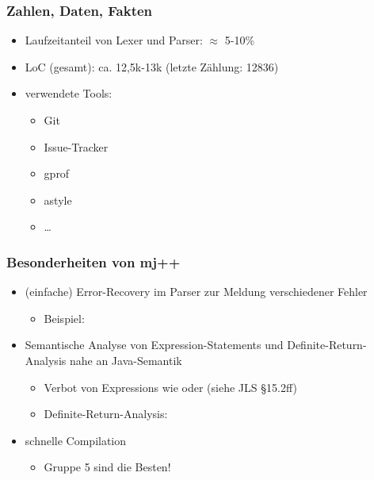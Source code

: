 \begin{frame}
	\frametitle{Zahlen, Daten, Fakten} %
	\begin{itemize}
		\item Laufzeitanteil von Lexer und Parser: $\approx$ 5-10\%	%
		\item LoC (gesamt): ca. 12,5k-13k (letzte Zählung: 12836)
		\item verwendete Tools: 
		\begin{itemize}
			\item Git
			\item Issue-Tracker
			\item gprof
			\item astyle
			\item \dots
		\end{itemize}
	\end{itemize}
\end{frame}

\begin{frame}
    \frametitle{Besonderheiten von mj++}
    \begin{itemize}
        \item (einfache) Error-Recovery im Parser zur Meldung verschiedener Fehler
        \begin{itemize}
        	\item Beispiel: \code{public static 12 [ void main...}
        \end{itemize} \pause
        \item Semantische Analyse von Expression-Statements und Definite-Return-Analysis nahe an Java-Semantik
        \begin{itemize}
        	\item Verbot von Expressions wie  oder  (siehe JLS §15.2ff)
        	\item Definite-Return-Analysis: 
        \end{itemize} \pause
        \item schnelle Compilation
            \pause
        \begin{itemize}
        \item Gruppe 5 sind die Besten!
        \end{itemize}
    \end{itemize}
\end{frame}